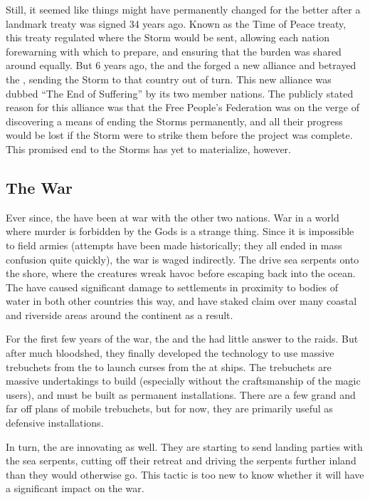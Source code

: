 \documentclass[blue]{GL2020}
\begin{document}
Still, it seemed like things might have permanently changed for the better after a landmark treaty was signed 34 years ago. Known as the Time of Peace treaty, this treaty regulated where the Storm would be sent, allowing each nation forewarning with which to prepare, and ensuring that the burden was shared around equally. But 6 years ago, the \pFarm{} and the \pTech{} forged a new alliance and betrayed the \pShip{}, sending the Storm to that country out of turn. This new alliance was dubbed ``The End of Suffering'' by its two member nations. The publicly stated reason for this alliance was that the Free People's Federation was on the verge of discovering a means of ending the Storms permanently, and all their progress would be lost if the Storm were to strike them before the project was complete. This promised end to the Storms has yet to materialize, however.

\subsection*{The War}
Ever since, the \pShip{} have been at war with the other two nations. War in a world where murder is forbidden by the Gods is a strange thing. Since it is impossible to field armies (attempts have been made historically; they all ended in mass confusion quite quickly), the war is waged indirectly. The \pShip{} drive sea serpents onto the shore, where the creatures wreak havoc before escaping back into the ocean. The \pShip{} have caused significant damage to settlements in proximity to bodies of water in both other countries this way, and have staked claim over many coastal and riverside areas around the continent as a result.

For the first few years of the war, the \pFarm{} and the \pTech{} had little answer to the \pShippies{} raids. But after much bloodshed, they finally developed the technology to use massive trebuchets from the \pTech{} to launch curses from the \pFarm{} at \pShippie{} ships. The trebuchets are massive undertakings to build (especially without the craftsmanship of the \pShip{} magic users), and must be built as permanent installations. There are a few grand and far off plans of mobile trebuchets, but for now, they are primarily useful as defensive installations.

In turn, the \pShip{} are innovating as well. They are starting to send landing parties with the sea serpents, cutting off their retreat and driving the serpents further inland than they would otherwise go. This tactic is too new to know whether it will have a significant impact on the war.
\end{document}
